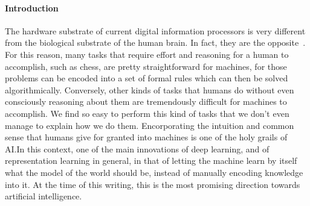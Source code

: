 \documentclass[../main.tex]{subfiles}
\begin{document}
    \paragraph{Introduction}
    The hardware substrate of current digital information processors is very different from the biological substrate of the human brain.
    In fact, they are the opposite~\cite{anusuya2010superficial}.
    For this reason, many tasks that require effort and reasoning for a human to accomplish, such as chess, are pretty straightforward for machines,
    for those problems can be encoded into a set of formal rules which can then be solved algorithmically.
    Conversely, other kinds of tasks that humans do without even consciously reasoning about them are tremendously difficult for machines to accomplish.
    We find so easy to perform this kind of tasks that we don't even manage to explain how we do them. Encorporating the intuition
    and common sense that humans give for granted into machines is one of the holy grails of AI.\@ In this context, one of the main
    innovations of deep learning, and of representation learning in general, in that of letting the machine learn by itself what the
    model of the world should be, instead of manually encoding knowledge into it. At the time of this writing, this is the most promising
    direction towards artificial intelligence.
\end{document}
